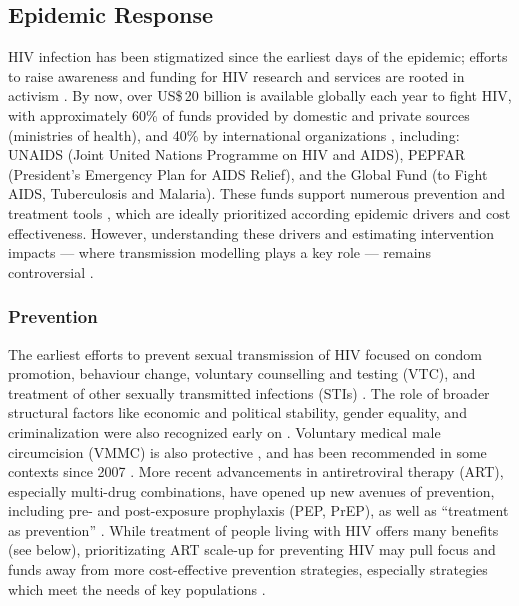 \subsection{Epidemic Response}\label{intro.hiv.resp}
HIV infection has been stigmatized since the earliest days of the epidemic;
efforts to raise awareness and funding for HIV research and services
are rooted in activism \cite{Merson2008}.
By now, over US\$\,20 billion is available globally each year to fight HIV, with approximately
60\% of funds provided by domestic and private sources (\eg ministries of health), and
40\% by international organizations \cite{UNAIDSFin}, including: %
UNAIDS (Joint United Nations Programme on HIV and AIDS),
PEPFAR (President's Emergency Plan for AIDS Relief), and
the Global Fund (to Fight AIDS, Tuberculosis and Malaria).
These funds support numerous prevention and treatment tools \cite{Eisinger2019tk},
which are ideally prioritized according epidemic drivers and cost effectiveness.
However, understanding these drivers and estimating intervention impacts
--- where transmission modelling plays a key role --- remains controversial
\cite{Shelton2010,Mutevedzi2014,Geffen2018,Baral2019}.
\subsubsection{Prevention}\label{intro.hiv.resp.prev}
The earliest efforts to prevent sexual transmission of HIV focused on
condom promotion, behaviour change, voluntary counselling and testing (VTC),
and treatment of other sexually transmitted infections (STIs) \cite{Royce1997,Marseille2002}.
The role of broader structural factors like
economic and political stability, gender equality, and criminalization
were also recognized early on \cite{Parker2000}.
Voluntary medical male circumcision (VMMC) is also protective \cite{Auvert2005},
and has been recommended in some contexts since 2007 \cite{WHO2020vmmc}.
More recent advancements in antiretroviral therapy (ART), especially multi-drug combinations,
have opened up new avenues of prevention, including
pre- and post-exposure prophylaxis (PEP, PrEP), as well as
``treatment as prevention'' \cite{Hosseinipour2002}.
While treatment of people living with HIV offers many benefits
(see  below),
prioritizating ART scale-up for preventing HIV
may pull focus and funds away from more cost-effective prevention strategies,
especially strategies which meet the needs of key populations
\cite{Shelton2010,Cohen2012,Baral2019}.
